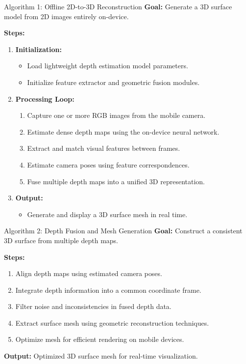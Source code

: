 \documentclass[11pt]{beamer}
\begin{document}
\begin{frame}{Algorithm 1: Offline 2D-to-3D Reconstruction}
\textbf{Goal:} Generate a 3D surface model from 2D images entirely on-device.

\medskip
\textbf{Steps:}
\begin{enumerate}
\item \textbf{Initialization:}
\begin{itemize}
\item Load lightweight depth estimation model parameters.
\item Initialize feature extractor and geometric fusion modules.
\end{itemize}

\item \textbf{Processing Loop:}
\begin{enumerate}
\item Capture one or more RGB images from the mobile camera.
\item Estimate dense depth maps using the on-device neural network.
\item Extract and match visual features between frames.
\item Estimate camera poses using feature correspondences.
\item Fuse multiple depth maps into a unified 3D representation.
\end{enumerate}

\item \textbf{Output:}
\begin{itemize}
\item Generate and display a 3D surface mesh in real time.
\end{itemize}
\end{enumerate}
\end{frame}

\begin{frame}{Algorithm 2: Depth Fusion and Mesh Generation}
\textbf{Goal:} Construct a consistent 3D surface from multiple depth maps.

\medskip
\textbf{Steps:}
\begin{enumerate}
\item Align depth maps using estimated camera poses.
\item Integrate depth information into a common coordinate frame.
\item Filter noise and inconsistencies in fused depth data.
\item Extract surface mesh using geometric reconstruction techniques.
\item Optimize mesh for efficient rendering on mobile devices.
\end{enumerate}

\medskip
\textbf{Output:} Optimized 3D surface mesh for real-time visualization.
\end{frame}
\end{document}
